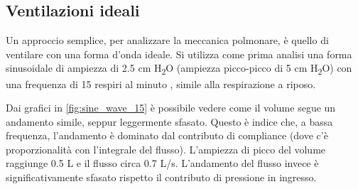 \subsection{Ventilazioni ideali}

Un approccio semplice, per analizzare la meccanica polmonare, è quello di ventilare con una forma d'onda ideale. Si utilizza come prima analisi una forma sinusoidale di ampiezza di 2.5 cm H\textsubscript{2}O (ampiezza picco-picco di 5 cm H\textsubscript{2}O) con una frequenza di 15 respiri al minuto \cite{khoo_physiological_2018}, simile alla respirazione a riposo.

Dai grafici in \cref{fig:sine_wave_15} è possibile vedere come il volume segue un andamento simile, seppur leggermente sfasato. Questo è indice che, a bassa frequenza, l'andamento è dominato dal contributo di compliance (dove c'è proporzionalità con l'integrale del flusso). L'ampiezza di picco del volume raggiunge 0.5 L e il flusso circa 0.7 L/s. L'andamento del flusso invece è significativamente sfasato rispetto il contributo di pressione in ingresso. 


